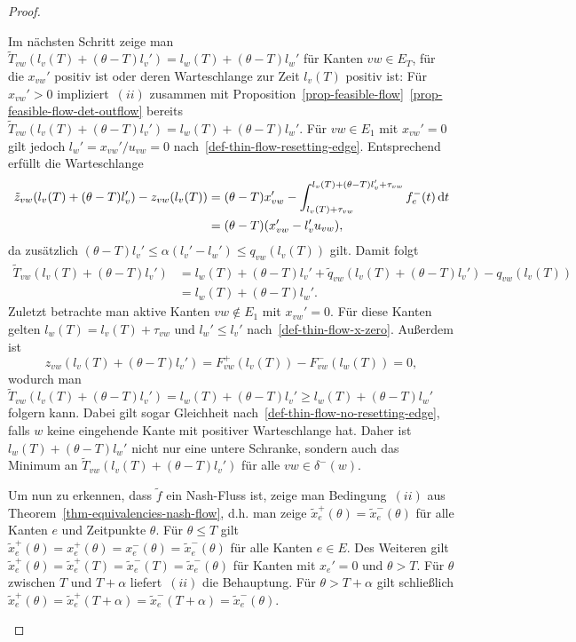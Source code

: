 \begin{proof}
\begin{description}[leftmargin=0cm, topsep=0cm, itemindent=0.5cm]
		Im nächsten Schritt zeige man $\tilde{T}_{vw}(l_v(T) + (\theta - T)l_v') = l_w(T) + (\theta - T) l_w'$ für Kanten $vw\in E_T$, für die $x_{vw}'$ positiv ist oder deren Warteschlange zur Zeit $l_v(T)$ positiv ist:
		Für $x_{vw}' > 0$ impliziert~$(ii)$ zusammen mit Proposition~\ref{prop-feasible-flow}~\ref{prop-feasible-flow-det-outflow} bereits $\tilde{T}_{vw}(l_v(T) + (\theta-T)l_v') = l_w(T) + (\theta - T) l_w'$.
		Für $vw\in E_1$ mit $x_{vw}'=0$ gilt jedoch $l_w' = x_{vw}' / u_{vw} = 0$ nach~\ref{def-thin-flow-resetting-edge}.
		Entsprechend erfüllt die Warteschlange
		\begin{align*}
		\tilde{z}_{vw}(l_v(T) + (\theta - T)l_v') - z_{vw}(l_v(T)) &= (\theta - T) x_{vw}' - \int_{l_v(T) + \tau_{vw}}^{l_v(T) + (\theta - T) l_v' + \tau_{vw}} f_e^-(t) \mathop{}\!\mathrm{d} t \\
		&= (\theta - T) (x_{vw}' -l_v' u_{vw}),
		\end{align*}
		da zusätzlich $(\theta-T) l_v' \leq \alpha (l_v' - l_w') \leq q_{vw}(l_v(T))$ gilt.
		Damit folgt
		\begin{align*}
		\tilde{T}_{vw}(l_v(T) + (\theta - T)l_v') &= l_w(T) + (\theta - T) l_v' + \tilde{q}_{vw}(l_v(T) + (\theta - T)l_v')- q_{vw}(l_v(T)) \\
		&= l_w(T) + (\theta - T) l_w'.
		\end{align*}
		Zuletzt betrachte man aktive Kanten $vw\notin E_1$ mit $x_{vw}' = 0$.
		Für diese Kanten gelten $l_w(T) = l_v(T) + \tau_{vw}$ und $l_w' \leq l_v'$ nach~\ref{def-thin-flow-x-zero}.
		Außerdem ist 
		\[
		z_{vw}(l_v(T) + (\theta - T) l_v') = F_{vw}^+(l_v(T)) - F_{vw}^-(l_w(T)) = 0,
		\]
		wodurch man $\tilde{T}_{vw}(l_v(T) + (\theta - T) l_v') = l_w(T) + (\theta - T)l_v' \geq l_w(T) + (\theta - T) l_w'$ folgern kann.
		Dabei gilt sogar Gleichheit nach~\ref{def-thin-flow-no-resetting-edge}, falls $w$ keine eingehende Kante mit positiver Warteschlange hat.
		Daher ist $l_w(T)+(\theta - T) l_w'$ nicht nur eine untere Schranke, sondern auch das Minimum an $\tilde{T}_{vw}(l_v(T) + (\theta - T) l_v')$ für alle $vw\in \delta^-(w)$.
		
		Um nun zu erkennen, dass $\tilde{f}$ ein Nash-Fluss ist, zeige man Bedingung~$(ii)$ aus Theorem~\ref{thm-equivalencies-nash-flow}, d.h. man zeige $\tilde{x}_e^+(\theta) = \tilde{x}_e^-(\theta)$ für alle Kanten $e$ und Zeitpunkte $\theta$.
		Für $\theta \leq T$ gilt $\tilde{x}_e^+(\theta) = x_e^+(\theta) = x_e^-(\theta) = \tilde{x}_e^-(\theta)$ für alle Kanten $e\in E$.
		Des Weiteren gilt $\tilde{x}_e^+(\theta) = \tilde{x}_e^+(T) = \tilde{x}_e^-(T) = \tilde{x}_e^-(\theta)$ für Kanten mit $x_{e}' = 0$ und $\theta > T$.
		Für $\theta$ zwischen $T$ und $T+\alpha$ liefert~$(ii)$ die Behauptung.
		Für $\theta > T+\alpha$ gilt schließlich $\tilde{x}_e^+(\theta) = \tilde{x}_e^+(T + \alpha) = \tilde{x}_e^-(T+\alpha) = \tilde{x}_e^-(\theta)$.
\end{description}\vspace{-1.4em}
\end{proof}
